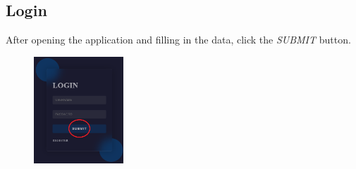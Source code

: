\begin{figure}[H]
\begin{subfigure}{0.45\textwidth}
     \end{subfigure}
\end{figure}


\subsection{Login}
After opening the application and filling in the data, click the \textit{SUBMIT} button.
\begin{figure}[H]
     \centering
     \includegraphics[width=0.3\textwidth]{guide_includes/img/login_submit.png}
\end{figure}


